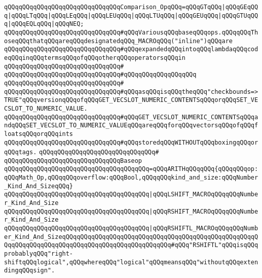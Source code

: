 \newline
\verb|qQQqqQQqqQQqqQQqqQQqqQQqqQQqqQQqComparison_OpqQQq=qQQqGTqQQq|\verb#|qQQqGEqQQq|qQQqLTqQQq|qQQqLEqQQq|qQQqLEUqQQq|qQQqLTUqQQq|qQQqGEUqQQq|qQQqGTUqQQq|qQQqEQLqQQq|qQQqNEQ;#\newline
\newline
\newline
\verb|qQQqqQQqqQQqqQQqqQQqqQQqqQQqqQQq#qQQqVariousqQQqbaseqQQqops.qQQqqQQqThoseqQQqthatqQQqareqQQqdesignatedqQQq_MACROqQQq("inline")qQQqare|\newline
\verb|qQQqqQQqqQQqqQQqqQQqqQQqqQQqqQQq#qQQqexpandedqQQqintoqQQqlambdaqQQqcodeqQQqinqQQqtermsqQQqofqQQqotherqQQqoperatorsqQQqin|\newline
\verb|qQQqqQQqqQQqqQQqqQQqqQQqqQQqqQQq#|\newline
\verb|qQQqqQQqqQQqqQQqqQQqqQQqqQQqqQQq#qQQqqQQqqQQqqQQqqQQq|\newline
\verb|qQQqqQQqqQQqqQQqqQQqqQQqqQQqqQQq#|\newline
\verb|qQQqqQQqqQQqqQQqqQQqqQQqqQQqqQQq#qQQqasqQQqisqQQqtheqQQq"checkbounds=>TRUE"qQQqversionqQQqofqQQqGET_VECSLOT_NUMERIC_CONTENTSqQQqorqQQqSET_VECSLOT_TO_NUMERIC_VALUE.|\newline
\verb|qQQqqQQqqQQqqQQqqQQqqQQqqQQqqQQq#qQQqGET_VECSLOT_NUMERIC_CONTENTSqQQqandqQQqSET_VECSLOT_TO_NUMERIC_VALUEqQQqareqQQqforqQQqvectorsqQQqofqQQqfloatsqQQqorqQQqints|\newline
\verb|qQQqqQQqqQQqqQQqqQQqqQQqqQQqqQQq#qQQqstoredqQQqWITHOUTqQQqboxingqQQqorqQQqtags.|\newline
\verb|qQQqqQQqqQQqqQQqqQQqqQQqqQQqqQQq#|\newline
\verb|qQQqqQQqqQQqqQQqqQQqqQQqqQQqqQQqBaseop|\newline
\verb|qQQqqQQqqQQqqQQqqQQqqQQqqQQqqQQqqQQqqQQq=qQQqARITHqQQqqQQq{qQQqqQQqop:qQQqMath_Op,qQQqqQQqoverflow:qQQqBool,qQQqqQQqkind_and_size:qQQqNumber_Kind_And_SizeqQQq}|\newline
\verb|qQQqqQQqqQQqqQQqqQQqqQQqqQQqqQQqqQQqqQQq|\verb#|qQQqLSHIFT_MACROqQQqqQQqNumber_Kind_And_Size#\newline
\verb|qQQqqQQqqQQqqQQqqQQqqQQqqQQqqQQqqQQqqQQq|\verb#|qQQqRSHIFT_MACROqQQqqQQqNumber_Kind_And_Size#\newline
\verb|qQQqqQQqqQQqqQQqqQQqqQQqqQQqqQQqqQQqqQQq|\verb#|qQQqRSHIFTL_MACROqQQqqQQqNumber_Kind_And_SizeqQQqqQQqqQQqqQQqqQQqqQQqqQQqqQQqqQQqqQQqqQQqqQQqqQQqqQQqqQQqqQQqqQQqqQQqqQQqqQQqqQQqqQQqqQQqqQQqqQQq#\verb|#qQQq"RSHIFTL"qQQqisqQQqprobablyqQQq"right-shiftqQQqlogical",qQQqwhereqQQq"logical"qQQqmeansqQQq"withoutqQQqextendingqQQqsign".|\newline
